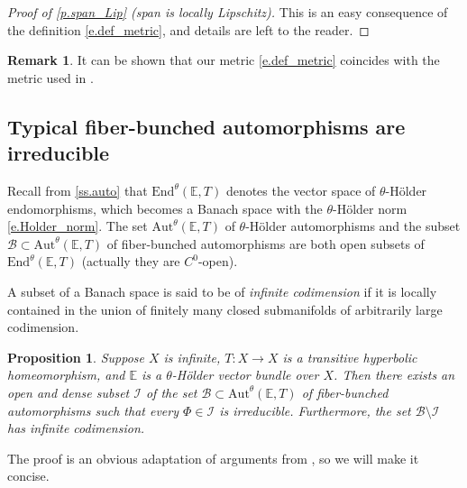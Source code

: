 \documentclass[JEP,XML,SOM,Unicode]{cedram}
\let\mathcal\mathscr
\theoremstyle{plain}
\newtheorem{proposition}[theorem]{Proposition}
\theoremstyle{definition}
\newtheorem{remark}[theorem]{Remark}
\newcommand{\EE}{\mathbb{E}}
\newcommand{\cB}{\mathcal{B}}
\newcommand{\cI}{\mathcal{I}}
\newcommand{\Aut}{\mathrm{Aut}}
\newcommand{\End}{\mathrm{End}}
\begin{document}
\begin{proof}[Proof of \cref{p.span_Lip} (span is locally Lipschitz)]
This is an easy consequence of the definition \eqref{e.def_metric}, and details are left to the reader.
\end{proof}

\begin{remark}
It can be shown that our metric \eqref{e.def_metric} coincides with the metric used in \cite[\S A.1]{BPS}.
\end{remark}

\subsection{Typical fiber-bunched automorphisms are irreducible}\label{ss.irred_typical}
Recall from \cref{ss.auto} that $\End^\theta(\EE,T)$ denotes the vector space of $\theta$-Hölder endomorphisms, which becomes a Banach space with the $\theta$-Hölder norm \eqref{e.Holder_norm}.
The set $\Aut^\theta(\EE,T)$ of $\theta$-Hölder automorphisms
and the subset $\cB \subset \Aut^\theta(\EE,T)$ of fiber-bunched automorphisms
are both open subsets of $\End^\theta(\EE,T)$ (actually they are $C^0$-open).

A subset of a Banach space is said to be of \emph{infinite codimension} if it is locally contained in the union of finitely many closed submanifolds of arbitrarily large codimension.

\begin{proposition}\label{p.irred_typical}
Suppose $X$ is infinite, $T \colon X \to X$ is a transitive hyperbolic homeomorphism, and $\EE$ is a $\theta$-Hölder vector bundle over $X$.
Then there exists an open and dense subset $\cI$ of the set $\cB \subset \Aut^\theta(\EE,T)$ of fiber-bunched automorphisms such that every $\Phi \in \cI$ is irreducible.
Furthermore, the set $\cB \setminus \cI$ has infinite codimension.
\end{proposition}

The proof is an obvious adaptation of arguments from \cite{BGV,Viana}, so we will make it concise.
\end{document}
